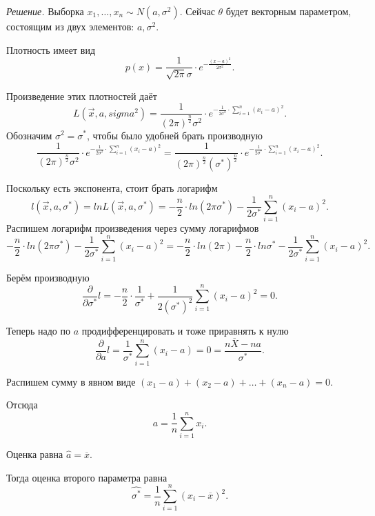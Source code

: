 \textit{Решение.} Выборка $x_1, \dotsc, x_n \sim N \left( a, \sigma^2 \right) $.
Сейчас $ \theta $ будет векторным параметром, состоящим из двух элементов: $a, \sigma^2$.

Плотность имеет вид
$$p \left( x \right) =
  \frac{1}{ \sqrt{2 \pi } \sigma } \cdot e^{- \frac{ \left( x - a \right)^2}{2 \sigma^2}}.$$

Произведение этих плотностей даёт
$$L \left( \vec{x}, a, sigma^2 \right) =
  \frac{1}{ \left( 2 \pi \right)^{ \frac{n}{2}} \sigma^2}
  \cdot e^{- \frac{1}{2 \sigma^2} \cdot \sum \limits_{i = 1}^n \left( x_i - a \right)^2}.$$
Обозначим $ \sigma^2 = \sigma^*$, чтобы было удобней брать производную
$$ \frac{1}{ \left( 2 \pi \right)^{ \frac{n}{2}} \sigma^2}
  \cdot e^{- \frac{1}{2 \sigma^2} \cdot \sum \limits_{i = 1}^n \left( x_i - a \right)^2} =
  \frac{1}{ \left( 2 \pi \right)^{ \frac{n}{2}} \left( \sigma^* \right)^{ \frac{n}{2}}} \cdot
  e^{- \frac{1}{2 \sigma^*} \cdot \sum \limits_{i = 1}^n \left( x_i - a \right)^2}.$$

Поскольку есть экспонента, стоит брать логарифм
$$l \left( \vec{x}, a, \sigma^* \right) =
  ln L \left( \vec{x}, a, \sigma^* \right) =
  - \frac{n}{2} \cdot ln \left( 2 \pi \sigma^* \right) -
  \frac{1}{2 \sigma^*} \sum \limits_{i = 1}^n \left( x_i - a \right)^2.$$
Распишем логарифм произведения через сумму логарифмов
$$- \frac{n}{2} \cdot ln \left( 2 \pi \sigma^* \right) -
  \frac{1}{2 \sigma^*} \sum \limits_{i = 1}^n \left( x_i - a \right)^2 =
  - \frac{n}{2} \cdot ln \left( 2 \pi \right) -
  \frac{n}{2} \cdot ln \sigma^* -
  \frac{1}{2 \sigma^*} \sum \limits_{i = 1}^n \left( x_i - a \right)^2.$$

Берём производную
$$ \frac{ \partial }{ \partial \sigma^*} l =
  - \frac{n}{2} \cdot \frac{1}{ \sigma^*} +
  \frac{1}{2 \left( \sigma^* \right)^2} \sum \limits_{i = 1}^n \left( x_i - a \right)^2 =
  0.$$

Теперь надо по $a$ продифференцировать и тоже приравнять к нулю
$$ \frac{ \partial }{ \partial a} l =
  \frac{1}{ \sigma^*} \sum \limits_{i = 1}^n \left( x_i - a \right) =
  0 =
  \frac{n \overline{X} - na}{ \sigma^*}.$$

Распишем сумму в явном виде
$ \left( x_1 - a \right) + \left( x_2 - a \right) + \dotsc + \left( x_n - a \right) =
  0$.

Отсюда
$$a =
  \frac{1}{n} \sum \limits_{i = 1}^n x_i.$$

Оценка равна $ \hat{a} = \overline{x}.$

Тогда оценка второго параметра равна
$$ \hat{ \sigma^*} =
  \frac{1}{n} \sum \limits_{i = 1}^n \left( x_i - \overline{x} \right)^2.$$

